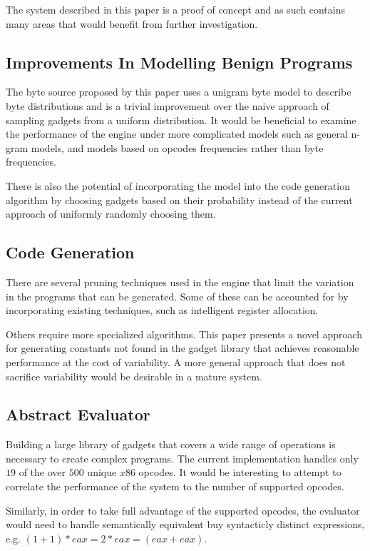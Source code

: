     The system described in this paper is a proof of concept and as such
    contains many areas that would benefit from further investigation.

    \subsection{Improvements In Modelling Benign Programs}

    The byte source proposed by this paper uses a unigram byte model to describe
    byte distributions and is a trivial improvement over the naive approach of
    sampling gadgets from a uniform distribution. It would be beneficial to
    examine the performance of the engine under more complicated models such as
    general n-gram models, and models based on opcodes frequencies rather than
    byte frequencies.

    There is also the potential of incorporating the model into the code
    generation algorithm by choosing gadgets based on their probability instead
    of the current approach of uniformly randomly choosing them.

    \subsection{Code Generation}

    There are several pruning techniques used in the engine that limit the
    variation in the programs that can be generated. Some of these can be
    accounted for by incorporating existing techniques, such as intelligent
    register allocation\cite{register-coloring}.

    Others require more specialized algorithms. This paper presents a novel
    approach for generating constants not found in the gadget library that
    achieves reasonable performance at the cost of variability. A more general
    approach that does not sacrifice variability would be desirable in a mature
    system.

    \subsection{Abstract Evaluator}

    Building a large library of gadgets that covers a wide range of operations
    is necessary to create complex programs. The current implementation handles
    only $19$ of the over $500$ unique $x86$ opcodes. It would be
    interesting to attempt to correlate the performance of the system to the
    number of supported opcodes.

    Similarly, in order to take full advantage of the supported opcodes, the
    evaluator would need to handle semantically equivalent buy syntacticly
    distinct expressions, e.g. $(1+1)*eax = 2*eax = (eax+eax)$.

%
